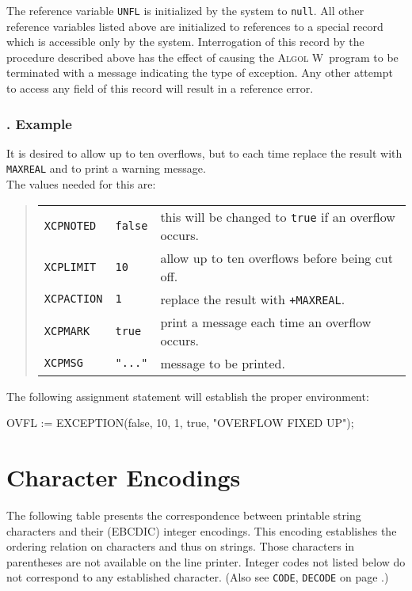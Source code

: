 \documentclass[a4paper]{article}
\def\ALGOLW{\textsc{Algol W}}
\def\quietsubsubsection#1{\addtocounter{subsubsection}{1}\subsubsection*{\thesubsubsection. #1}}
\def\Example{\quietsubsubsection{Example}}
\def\A{\lstinline[language=AlgolW,style=ReferenceManual]}
\def\R#1{\lstinline[language=AlgolW,style=ReferenceManual]{#1}}
\begin{document}
The reference variable \A!UNFL! is initialized by the system to
\R{null}.  All other reference variables listed above are initialized
to references to a special record which is accessible only by the
system. Interrogation of this record by the procedure described above
has the effect of causing the \ALGOLW\ program to be terminated with a
message indicating the type of exception. Any other attempt to access
any field of this record will result in a reference error.

\Example

It is desired to allow up to ten overflows, but to each time replace
the result with \A!MAXREAL! and to print a warning message. \\

\noindent The values needed for this are:

\begin{quote}
\begin{tabular}{lll}
\A!XCPNOTED!  & \R{false} & this will be changed to \R{true} if an overflow occurs. \\
\A!XCPLIMIT!  & \A!10!    & allow up to ten overflows before being cut off. \\
\A!XCPACTION! & \A!1!     & replace the result with \A!+MAXREAL!. \\
\A!XCPMARK!   & \R{true}  & print a message each time an overflow occurs. \\
\A!XCPMSG!    & \A!"..."! & message to be printed.
\end{tabular}
\end{quote}

\noindent The following assignment statement will establish the proper
environment:

\begin{AlgolWExample}
OVFL := EXCEPTION(false, 10, 1, true, "OVERFLOW FIXED UP");
\end{AlgolWExample}



\newpage
\appendix
\section{Character Encodings}
\label{Character Encodings}
\label{EBCDIC}

The following table presents the correspondence between printable
string characters and their (EBCDIC) integer encodings. This encoding
establishes the ordering relation on characters and thus on strings.
Those characters in parentheses are not available on the line printer.
Integer codes not listed below do not correspond to any established
character. (Also see \A!CODE!, \A!DECODE! on page \pageref{DECODE}.)
\end{document}
